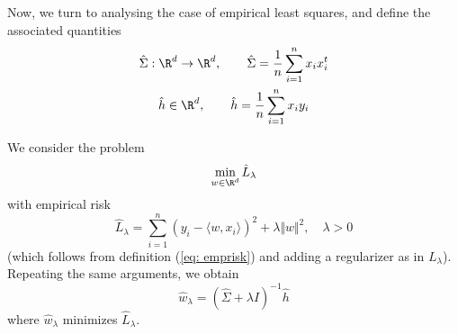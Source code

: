 Now, we turn to analysing the case of empirical least squares, and define the associated quantities
\begin{gather*}
    \hat\Sigma:\R^d\to\R^d, \qquad \hat \Sigma = \frac{1}{n}\sum_{i=1}^n x_i x_i^t\\
    \hat h\in\R^d, \qquad \hat h= \frac{1}{n}\sum_{i=1}^n x_iy_i
    \end{gather*}

We consider the problem
\[\min_{w\in\R^d} \hat L_\lambda\]
with empirical risk
\[\hat L_\lambda = \sum_{i=1}^n (y_i - \langle w, x_i\rangle)^2 + \lambda \Vert w \Vert ^2, \quad \lambda>0\]
(which follows from definition (\ref{eq: emprisk}) and adding a regularizer as in $L_\lambda$).
Repeating the same arguments, we obtain
\[\hat w_\lambda = (\hat \Sigma + \lambda I)^{-1} \hat h\]
where $\hat w_\lambda$ minimizes $\hat L_\lambda$.
